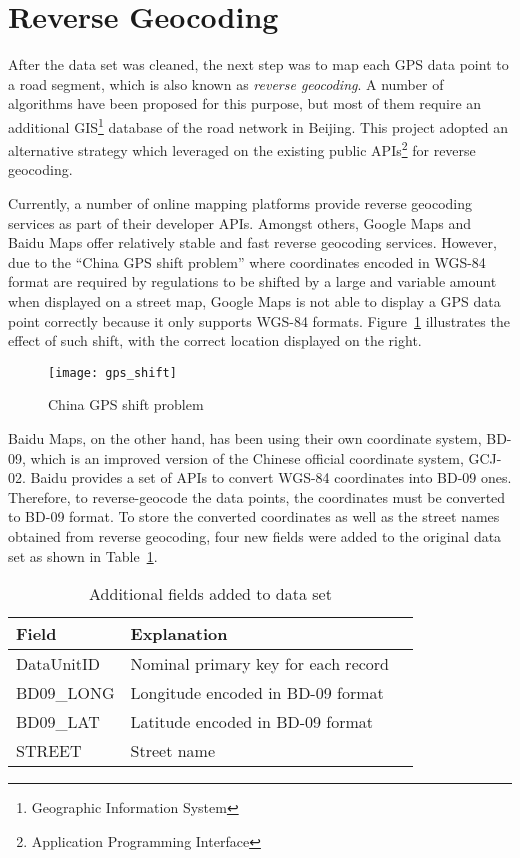 \section{Reverse Geocoding}
After the data set was cleaned, the next step was to map each GPS data point to a road segment, which is also known as \emph{reverse geocoding}. A number of algorithms\cite{MAP09} have been proposed for this purpose, but most of them require an additional GIS\footnote{Geographic Information System} database of the road network in Beijing. This project adopted an alternative strategy which leveraged on the existing public APIs\footnote{Application Programming Interface} for reverse geocoding. 

Currently, a number of online mapping platforms provide reverse geocoding services as part of their developer APIs. Amongst others, Google Maps and Baidu Maps offer relatively stable and fast reverse geocoding services. However, due to the ``China GPS shift problem''\cite{GSHF17} where coordinates encoded in WGS-84 format are required by regulations to be shifted by a large and variable amount when displayed on a street map, Google Maps is not able to display a GPS data point correctly because it only supports WGS-84 formats. Figure~\ref{Fig:gps_shift} illustrates the effect of such shift, with the correct location displayed on the right. 

\begin{figure}[h]
\texttt{[image: gps\_shift]}
\centering
\caption{China GPS shift problem}\label{Fig:gps_shift}
\end{figure}

Baidu Maps, on the other hand, has been using their own coordinate system, BD-09, which is an improved version of the Chinese official coordinate system, GCJ-02. Baidu provides a set of APIs to convert WGS-84 coordinates into BD-09 ones. Therefore, to reverse-geocode the data points, the coordinates must be converted to BD-09 format. To store the converted coordinates as well as the street names obtained from reverse geocoding, four new fields were added to the original data set as shown in Table~\ref{Ta:addtional_field}.

\begin{table}
\centering
\begin{tabular}{ | l | l | l | }
\hline
\textbf{Field} & \textbf{Explanation} \\ \hline
DataUnitID & Nominal primary key for each record \\ \hline
BD09\_LONG & Longitude encoded in BD-09 format\\ \hline
BD09\_LAT & Latitude encoded in BD-09 format\\ \hline
STREET & Street name\\ \hline
\end{tabular}
\caption{Additional fields added to data set}\label{Ta:addtional_field}
\end{table}

